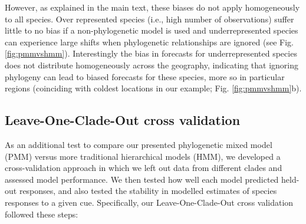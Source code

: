 \documentclass[11pt]{article}
\begin{document}
However, as explained in the main text, these biases do not apply homogeneously to all species. Over represented species (i.e., high number of observations) suffer little to no bias if a non-phylogenetic model is used and underrepresented species can experience large shifts when phylogenetic relationships are ignored (see Fig. \ref{fig:pmmvshmm}). Interestingly the bias in forecasts for underrepresented species does not distribute homogeneously across the geography, indicating that ignoring phylogeny can lead to biased forecasts for these species, more so in particular regions (coinciding with coldest locations in our example; Fig. \ref{fig:pmmvshmm}b).\\ 


\subsection*{Leave-One-Clade-Out cross validation}

As an additional test to compare our presented phylogenetic mixed model (PMM) versus more traditional hierarchical models (HMM), we developed a cross-validation approach in which we left out data from different clades and assessed model performance. We then tested how well each model predicted held-out responses, and also tested the stability in modelled estimates of species responses to a given cue. Specifically, our Leave-One-Clade-Out cross validation followed these steps:
\end{document}
